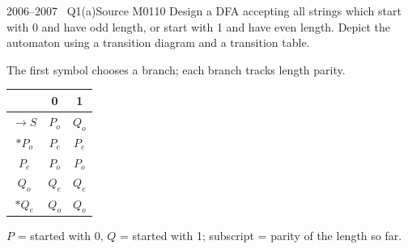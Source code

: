 \documentclass[11pt,a4paper]{article}
\begin{document}
\begin{question}{2006--2007 \textbullet\ Q1(a)}{Source M01}{10}
Design a DFA accepting all strings which start with 0 and have odd length, or start with 1 and have even length. Depict the automaton using a transition diagram and a transition table.
\end{question}
\begin{solution}
The first symbol chooses a branch; each branch tracks length parity.
\begin{center}
\begin{minipage}{.55\linewidth}\centering
{}\end{minipage}
\begin{minipage}{.35\linewidth}\centering\small
\begin{tabular}{c|cc}\toprule&0&1\\\midrule $\to S$&$P_o$&$Q_o$\\ $*P_o$&$P_e$&$P_e$\\ $P_e$&$P_o$&$P_o$\\ $Q_o$&$Q_e$&$Q_e$\\ $*Q_e$&$Q_o$&$Q_o$\\\bottomrule\end{tabular}\end{minipage}\end{center}
$P$ = started with 0, $Q$ = started with 1; subscript = parity of the length so far.
\end{solution}
\end{document}
